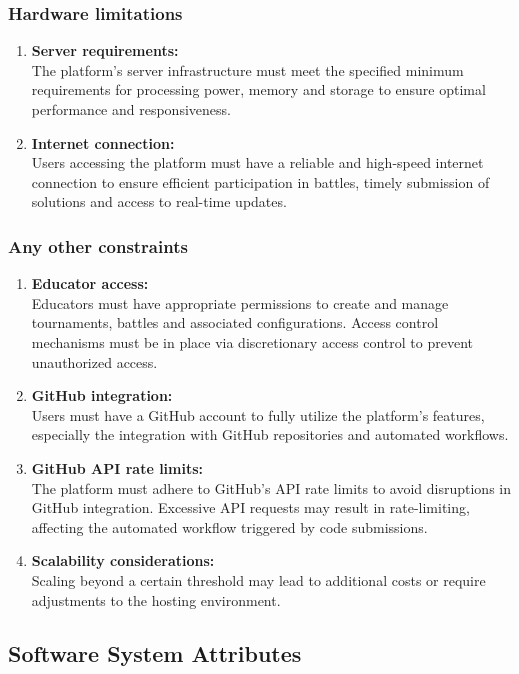 \subsubsection{Hardware limitations}
\begin{enumerate}
  \item \textbf{Server requirements:} \\
  The platform's server infrastructure must meet the specified minimum requirements for processing power, memory and storage to ensure optimal performance and responsiveness.
  \item \textbf{Internet connection:} \\
  Users accessing the platform must have a reliable and high-speed internet connection to ensure efficient participation in battles, timely submission of solutions and access to real-time updates.
\end{enumerate}

\subsubsection{Any other constraints}
\begin{enumerate}
  \item \textbf{Educator access:} \\
  Educators must have appropriate permissions to create and manage tournaments, battles and associated configurations. Access control mechanisms must be in place via discretionary access control to prevent unauthorized access.
  \item \textbf{GitHub integration:} \\
  Users must have a GitHub account to fully utilize the platform's features, especially the integration with GitHub repositories and automated workflows.
  \item \textbf{GitHub API rate limits:} \\
  The platform must adhere to GitHub's API rate limits to avoid disruptions in GitHub integration. Excessive API requests may result in rate-limiting, affecting the automated workflow triggered by code submissions.
  \item \textbf{Scalability considerations:} \\
  Scaling beyond a certain threshold may lead to additional costs or require adjustments to the hosting environment.
\end{enumerate}

\subsection{Software System Attributes}
